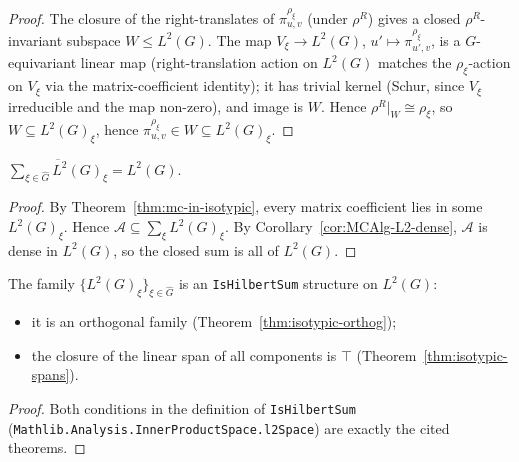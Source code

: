 \begin{proof}
  The closure of the right-translates of $\pi_{u,v}^{\rho_\xi}$ (under
  $\rho^R$) gives a closed $\rho^R$-invariant subspace $W \leq L^2(G)$.
  The map $V_\xi \to L^2(G)$, $u' \mapsto \pi_{u', v}^{\rho_\xi}$, is a
  $G$-equivariant linear map (right-translation action on $L^2(G)$ matches
  the $\rho_\xi$-action on $V_\xi$ via the matrix-coefficient identity);
  it has trivial kernel (Schur, since $V_\xi$ irreducible and the map
  non-zero), and image is $W$. Hence $\rho^R|_W \cong \rho_\xi$, so
  $W \subseteq L^2(G)_\xi$, hence $\pi_{u, v}^{\rho_\xi} \in W \subseteq L^2(G)_\xi$.
\end{proof}

\begin{theorem}
  \label{thm:isotypic-spans}
  $\overline{\sum_{\xi \in \widehat G} L^2(G)_\xi} = L^2(G)$.
\end{theorem}

\begin{proof}
  By Theorem~\ref{thm:mc-in-isotypic}, every matrix coefficient lies
  in some $L^2(G)_\xi$. Hence $\mathcal A \subseteq \sum_\xi L^2(G)_\xi$.
  By Corollary~\ref{cor:MCAlg-L2-dense}, $\mathcal A$ is dense in
  $L^2(G)$, so the closed sum is all of $L^2(G)$.
\end{proof}

\begin{theorem}
  \label{thm:PW-HilbertSum}
  The family $\{L^2(G)_\xi\}_{\xi \in \widehat G}$ is an
  \texttt{IsHilbertSum} structure on $L^2(G)$:
  \begin{itemize}
    \item it is an orthogonal family (Theorem~\ref{thm:isotypic-orthog});
    \item the closure of the linear span of all components is $\top$
      (Theorem~\ref{thm:isotypic-spans}).
  \end{itemize}
\end{theorem}

\begin{proof}
  Both conditions in the definition of \texttt{IsHilbertSum}
  (\texttt{Mathlib.Analysis.InnerProductSpace.l2Space}) are exactly
  the cited theorems.
\end{proof}


